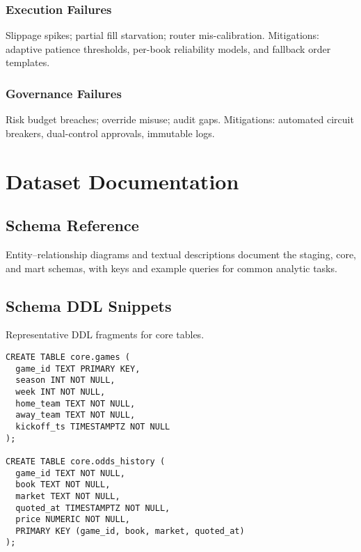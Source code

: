 \subsection{Execution Failures}
Slippage spikes; partial fill starvation; router mis-calibration. Mitigations: adaptive patience thresholds, per-book reliability models, and fallback order templates.

\subsection{Governance Failures}
Risk budget breaches; override misuse; audit gaps. Mitigations: automated circuit breakers, dual-control approvals, immutable logs.

\chapter{Dataset Documentation}\label{app:datasets}


\section{Schema Reference}\label{app:schema}
Entity--relationship diagrams and textual descriptions document the staging, core, and mart schemas, with keys and example queries for common analytic tasks.

\section{Schema DDL Snippets}\label{app:ddl}
Representative DDL fragments for core tables.
\begin{verbatim}
CREATE TABLE core.games (
  game_id TEXT PRIMARY KEY,
  season INT NOT NULL,
  week INT NOT NULL,
  home_team TEXT NOT NULL,
  away_team TEXT NOT NULL,
  kickoff_ts TIMESTAMPTZ NOT NULL
);

CREATE TABLE core.odds_history (
  game_id TEXT NOT NULL,
  book TEXT NOT NULL,
  market TEXT NOT NULL,
  quoted_at TIMESTAMPTZ NOT NULL,
  price NUMERIC NOT NULL,
  PRIMARY KEY (game_id, book, market, quoted_at)
);
\end{verbatim}


